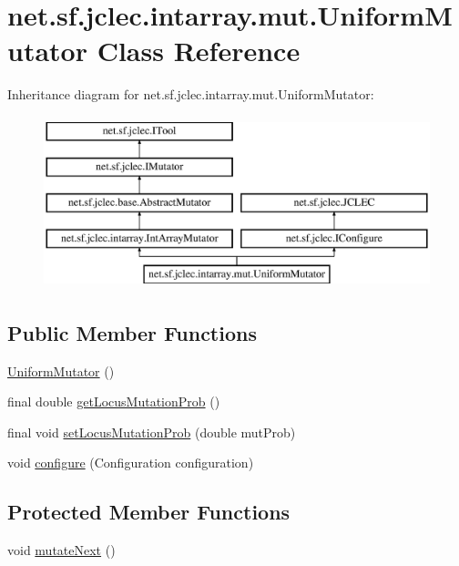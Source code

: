\hypertarget{classnet_1_1sf_1_1jclec_1_1intarray_1_1mut_1_1_uniform_mutator}{\section{net.\-sf.\-jclec.\-intarray.\-mut.\-Uniform\-Mutator Class Reference}
\label{classnet_1_1sf_1_1jclec_1_1intarray_1_1mut_1_1_uniform_mutator}
}
Inheritance diagram for net.\-sf.\-jclec.\-intarray.\-mut.\-Uniform\-Mutator\-:\begin{figure}[H]
\begin{center}
\leavevmode
\includegraphics[height=5.000000cm]{classnet_1_1sf_1_1jclec_1_1intarray_1_1mut_1_1_uniform_mutator}
\end{center}
\end{figure}
\subsection*{Public Member Functions}
\begin{DoxyCompactItemize}
\item 
\hyperlink{classnet_1_1sf_1_1jclec_1_1intarray_1_1mut_1_1_uniform_mutator_abdda21fb068ff6ea9c0a0c8f76f37b23}{Uniform\-Mutator} ()
\item 
final double \hyperlink{classnet_1_1sf_1_1jclec_1_1intarray_1_1mut_1_1_uniform_mutator_a153c30dad9fd65fae6a3c76f704731b6}{get\-Locus\-Mutation\-Prob} ()
\item 
final void \hyperlink{classnet_1_1sf_1_1jclec_1_1intarray_1_1mut_1_1_uniform_mutator_a9d953d94412cfd9798647100cfa24f34}{set\-Locus\-Mutation\-Prob} (double mut\-Prob)
\item 
void \hyperlink{classnet_1_1sf_1_1jclec_1_1intarray_1_1mut_1_1_uniform_mutator_ac173f2d97fc62ef414f6b8a873ea149a}{configure} (Configuration configuration)
\end{DoxyCompactItemize}
\subsection*{Protected Member Functions}
\begin{DoxyCompactItemize}
\item 
void \hyperlink{classnet_1_1sf_1_1jclec_1_1intarray_1_1mut_1_1_uniform_mutator_ac35f3eec57a49484815855ed1db9a2da}{mutate\-Next} ()
\end{DoxyCompactItemize}
